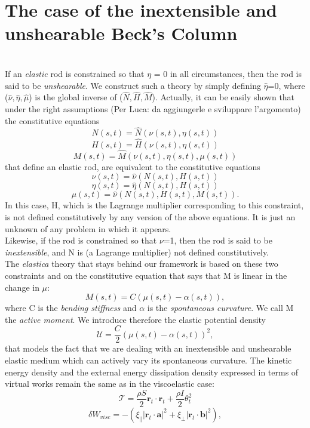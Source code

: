 
\section{The case of the inextensible and unshearable Beck's Column}

\\
If an \emph{elastic} rod is constrained so that $\eta$ = 0 in all circumstances, then the rod is said to be \emph{unshearable}.
We construct such a theory by simply defining $\hat{\eta}$=0, where ($\hat{\nu},\hat{\eta},\hat{\mu}$) is the global inverse of ($\hat{N},\hat{H},\hat{M}$). Actually, it can be easily shown that under the right assumptions (Per Luca: da aggiungerle e sviluppare l'argomento) the constitutive equations 
\[  N (s,t)=  \hat{N}(\nu (s,t),\eta (s,t))
\]
\[  H (s,t)=  \hat{H}(\nu (s,t),\eta (s,t)) 
\]
\[  M (s,t)=  \hat{M}(\nu (s,t),\eta (s,t), \mu(s,t))
\]
that define an elastic rod, are equivalent to the constitutive equations
\[  \nu (s,t)=  \hat{\nu}(N(s,t),H(s,t))
\]
\[  \eta (s,t)=  \hat{\eta}(N(s,t),H(s,t)) 
\]
\[  \mu (s,t)=  \hat{\nu}(N(s,t), H(s,t), M(s,t)).
\]
In this case, H, which is the Lagrange multiplier corresponding to this constraint, is not defined constitutively by any version of the above equations. It is just an unknown of any problem in which it appears.
\\
Likewise, if the rod is constrained so that $\nu$=1, then the rod is said to be \emph{inextensible}, and N is (a Lagrange multiplier) not defined constitutively.\\
The \emph{elastica} theory that stays behind our framework is based on these two constraints and on the constitutive equation that says that M is linear in the change in $\mu$:
\[
M(s,t) = C(\mu(s,t) − \alpha(s,t)),
\]
where C is the \emph{bending stiffness} and $\alpha$ is the \emph{spontaneous curvature}. We call M the \emph{active moment}. We introduce therefore the elastic potential density 
\[ \mathcal{U} = \frac{C}{2}(\mu(s,t) − \alpha(s,t))^2,\]
that models the fact that we are dealing with an inextensible and unshearable elastic medium which can actively vary its spontaneous curvature.
The kinetic energy density and the external energy dissipation density expressed in terms of virtual works remain the same as in the viscoelastic case:
\[
\mathcal{T} = \frac{\rho S}{2}\mathbf{r}_t \cdot \mathbf{r}_t + \frac{\rho I}{2}\theta_t^2
\]
\[ 
\delta W_{visc}= -(\xi_\parallel\left|\mathbf{r}_t\cdot\mathbf{a}\right|^2 + \xi_\perp \left|\mathbf{r}_t\cdot\mathbf{b}\right|^2),
\]

